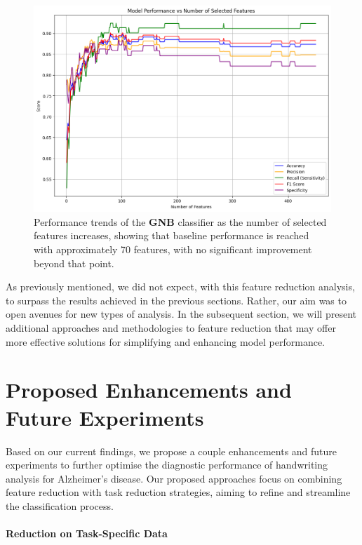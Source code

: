 \documentclass[a4paper, 11pt]{article}
\begin{document}
\begin{figure}[h!]
    \centering
    \includegraphics[width=\textwidth]{Figures/mrmr-gnb.png}
    \caption{\footnotesize{Performance trends of the \textbf{GNB} classifier as the number of selected features increases, showing that baseline performance is reached with approximately 70 features, with no significant improvement beyond that point.}}
    \label{fig:mrmr-gnb}
\end{figure}

As previously mentioned, we did not expect, with this feature reduction analysis, to surpass the results achieved in the previous sections. Rather, our aim was to open avenues for new types of analysis. In the subsequent section, we will present additional approaches and methodologies to feature reduction that may offer more effective solutions for simplifying and enhancing model performance.

\section{Proposed Enhancements and Future Experiments} \label{sec:proposals}

Based on our current findings, we propose a couple enhancements and future experiments to further optimise the diagnostic performance of handwriting analysis for Alzheimer's disease. Our proposed approaches focus on combining feature reduction with task reduction strategies, aiming to refine and streamline the classification process.

\paragraph{Reduction on Task-Specific Data}
\end{document}
